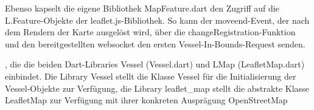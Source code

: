 Ebenso kapselt die eigene Bibliothek MapFeature.dart den Zugriff auf die L.Feature-Objekte der leaflet.js-Bibliothek. 
So kann der moveend-Event, der nach dem Rendern der Karte ausgelöst wird, über die changeRegistration-Funktion und den bereitgestellten websocket den ersten Vessel-In-Bounds-Request senden.



, die die beiden Dart-Libraries Vessel (Vessel.dart) und LMap (LeafletMap.dart) einbindet. Die Library Vessel stellt die Klasse Vessel für die Initialisierung der Vessel-Objekte zur Verfügung, die Library leaflet\_map stellt die abstrakte Klasse LeafletMap zur Verfügung mit ihrer konkreten Ausprägung OpenStreetMap 
